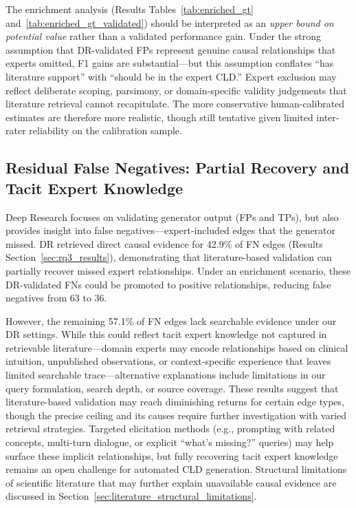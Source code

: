 The enrichment analysis (Results Tables~\ref{tab:enriched_gt} and~\ref{tab:enriched_gt_validated}) should be interpreted as an \emph{upper bound on potential value} rather than a validated performance gain. Under the strong assumption that DR-validated FPs represent genuine causal relationships that experts omitted, F1 gains are substantial---but this assumption conflates ``has literature support'' with ``should be in the expert CLD.'' Expert exclusion may reflect deliberate scoping, parsimony, or domain-specific validity judgements that literature retrieval cannot recapitulate. The more conservative human-calibrated estimates are therefore more realistic, though still tentative given limited inter-rater reliability on the calibration sample.

\subsection{Residual False Negatives: Partial Recovery and Tacit Expert Knowledge}

Deep Research focuses on validating generator output (FPs and TPs), but also provides insight into false negatives---expert-included edges that the generator missed. DR retrieved direct causal evidence for 42.9\% of FN edges (Results Section~\ref{sec:rq3_results}), demonstrating that literature-based validation can partially recover missed expert relationships. Under an enrichment scenario, these DR-validated FNs could be promoted to positive relationships, reducing false negatives from 63 to 36.

However, the remaining 57.1\% of FN edges lack searchable evidence under our DR settings. While this could reflect tacit expert knowledge not captured in retrievable literature---domain experts may encode relationships based on clinical intuition, unpublished observations, or context-specific experience that leaves limited searchable trace---alternative explanations include limitations in our query formulation, search depth, or source coverage. These results suggest that literature-based validation may reach diminishing returns for certain edge types, though the precise ceiling and its causes require further investigation with varied retrieval strategies. Targeted elicitation methods (e.g., prompting with related concepts, multi-turn dialogue, or explicit ``what's missing?'' queries) may help surface these implicit relationships, but fully recovering tacit expert knowledge remains an open challenge for automated CLD generation. Structural limitations of scientific literature that may further explain unavailable causal evidence are discussed in Section~\ref{sec:literature_structural_limitations}.

